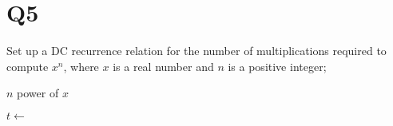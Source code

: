 \documentclass[11pt]{article}
\begin{document}
\section*{Q5}
Set up a DC recurrence relation for the number of
multiplications required to compute $x^{n}$, where $x$ is a real
number and $n$ is a positive integer;
\begin{solution}
    
    \begin{algorithm}
        \caption{$n$ power of $x$}
        \begin{algorithmic}
            \State{}
            \EndIf

            \State{}
            \EndIf

            \State $t\gets$ 
            \State{}
            \Else 
            \State{}
            \EndIf
            \EndProcedure
        \end{algorithmic}
    \end{algorithm}
\end{solution}
\end{document}
